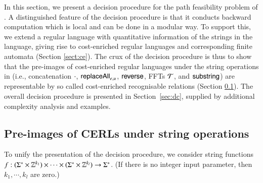 

%

In this section, we present a decision procedure for the path feasibility problem of {\slint}. A distinguished feature of the decision procedure is that it conducts backward computation which is local and can be done in a modular way. To support this, we extend  a regular language with quantitative information of the strings in the language, giving rise to cost-enriched regular languages and corresponding finite automata (Section \ref{sect:ce}). The crux of the decision procedure is thus to %
show that the %
pre-images of cost-enriched regular languages under the string operations in {\slint} (i.e., concatenation $\cdot$, $\mathsf{replaceAll}_{e,u}$, $\mathsf{reverse}$, FFTs $\mathcal{T}$, and $\mathsf{substring}$) are representable by so called cost-enriched recognisable relations (Section \ref{sect:pre}). The overall decision procedure is presented in Section~\ref{sec:dc}, supplied by additional complexity analysis and examples. 




\subsection{Pre-images of CERLs under string operations} \label{sect:pre}

To unify the presentation of the decision procedure, %
we consider string functions $f: (\Sigma^* \times \mathbb{Z}^{k_1}) \times \cdots \times (\Sigma^* \times \mathbb{Z}^{k_l}) \rightarrow \Sigma^*$. (If there is no integer input parameter, then $k_1,\cdots,k_l$ are zero.)  

